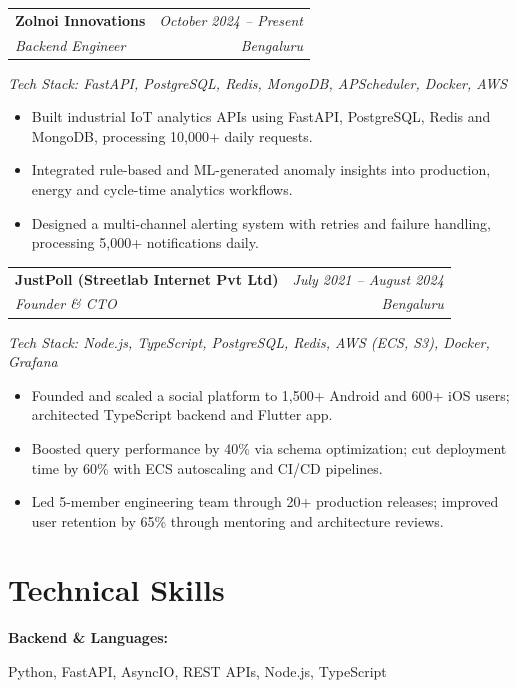 \documentclass[11pt,a4paper]{article}
\makeatletter
\newcommand{\resumeheading}[4]{
  \noindent
  \begin{tabularx}{\textwidth}{@{}X r@{}}
    \textbf{\color{navyblue}#1} & \textit{\color{lightgray}#2} \\
    \textit{#3} & \textit{\color{lightgray}#4}
  \end{tabularx}\vspace{1pt}
}
\newcommand{\skillcategory}[2]{
  \textbf{\color{navyblue}#1:} \raggedright #2
}
\makeatother
\begin{document}
\resumeheading{Zolnoi Innovations}{October 2024 -- Present}{Backend Engineer}{Bengaluru}
\vspace{2pt}
\textit{\small Tech Stack: FastAPI, PostgreSQL, Redis, MongoDB, APScheduler, Docker, AWS}
\vspace{2pt}
\begin{itemize}
\item Built industrial IoT analytics APIs using FastAPI, PostgreSQL, Redis and MongoDB, processing 10,000+ daily requests.
\item Integrated rule-based and ML-generated anomaly insights into production, energy and cycle-time analytics workflows.
\item Designed a multi-channel alerting system with retries and failure handling, processing 5,000+ notifications daily.
\end{itemize}

\vspace{3pt}

\resumeheading{JustPoll (Streetlab Internet Pvt Ltd)}{July 2021 -- August 2024}{Founder \& CTO}{Bengaluru}
\vspace{1pt}
\textit{\small Tech Stack: Node.js, TypeScript, PostgreSQL, Redis, AWS (ECS, S3), Docker, Grafana}
\vspace{2pt}
\begin{itemize}
\item Founded and scaled a social platform to 1,500+ Android and 600+ iOS users; architected TypeScript backend and Flutter app.
\item Boosted query performance by 40\% via schema optimization; cut deployment time by 60\% with ECS autoscaling and CI/CD pipelines.
\item Led 5-member engineering team through 20+ production releases; improved user retention by 65\% through mentoring and architecture reviews.
\end{itemize}

\vspace{2pt}

\section{Technical Skills}

\skillcategory{Backend \& Languages}{Python, FastAPI, AsyncIO, REST APIs, Node.js, TypeScript}

\vspace{2pt}
\end{document}
